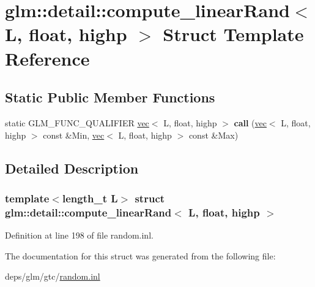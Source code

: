 \hypertarget{structglm_1_1detail_1_1compute__linearRand_3_01L_00_01float_00_01highp_01_4}{}\section{glm\+:\+:detail\+:\+:compute\+\_\+linear\+Rand$<$ L, float, highp $>$ Struct Template Reference}
\label{structglm_1_1detail_1_1compute__linearRand_3_01L_00_01float_00_01highp_01_4}
\subsection*{Static Public Member Functions}
\begin{DoxyCompactItemize}
\item 
\mbox{\label{structglm_1_1detail_1_1compute__linearRand_3_01L_00_01float_00_01highp_01_4_ae88fc17c7e8d130fc3bf761036b5d615}} 
static G\+L\+M\+\_\+\+F\+U\+N\+C\+\_\+\+Q\+U\+A\+L\+I\+F\+I\+ER \hyperlink{structglm_1_1vec}{vec}$<$ L, float, highp $>$ {\bfseries call} (\hyperlink{structglm_1_1vec}{vec}$<$ L, float, highp $>$ const \&Min, \hyperlink{structglm_1_1vec}{vec}$<$ L, float, highp $>$ const \&Max)
\end{DoxyCompactItemize}


\subsection{Detailed Description}
\subsubsection*{template$<$length\+\_\+t L$>$\newline
struct glm\+::detail\+::compute\+\_\+linear\+Rand$<$ L, float, highp $>$}



Definition at line 198 of file random.\+inl.



The documentation for this struct was generated from the following file\+:\begin{DoxyCompactItemize}
\item 
deps/glm/gtc/\hyperlink{random_8inl}{random.\+inl}\end{DoxyCompactItemize}
